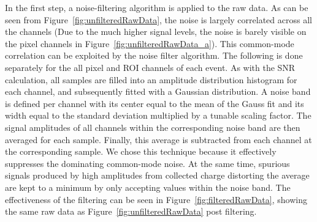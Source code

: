 \documentclass[instruments,article,accept,moreauthors,pdftex]{Definitions/mdpi}
\begin{document}
In the first step, a noise-filtering algorithm is applied to the raw data.
As can be seen from Figure~\ref{fig:unfilteredRawData}, the noise is largely correlated across all the channels (Due to the much higher signal levels, the noise is barely visible on the pixel channels in Figure~\ref{fig:unfilteredRawData_a}).
This common-mode correlation can be exploited by the noise filter algorithm.
The following is done separately for the all pixel and ROI channels of each event.
As with the SNR calculation, all samples are filled into an amplitude distribution histogram for each channel, and subsequently fitted with a Gaussian distribution.
A noise band is defined per channel with its center equal to the mean of the Gauss fit and its width equal to the standard deviation multiplied by a tunable scaling factor.
The signal amplitudes of all channels within the corresponding noise band are then averaged for each sample.
Finally, this average is subtracted from each channel at the corresponding sample.
We chose this technique because it effectively suppresses the dominating common-mode noise.
At the same time, spurious signals produced by high amplitudes from collected charge distorting the average are kept to a minimum by only accepting values within the noise band.
The effectiveness of the filtering can be seen in Figure~\ref{fig:filteredRawData}, showing the same raw data as Figure~\ref{fig:unfilteredRawData} post filtering.
\end{document}
